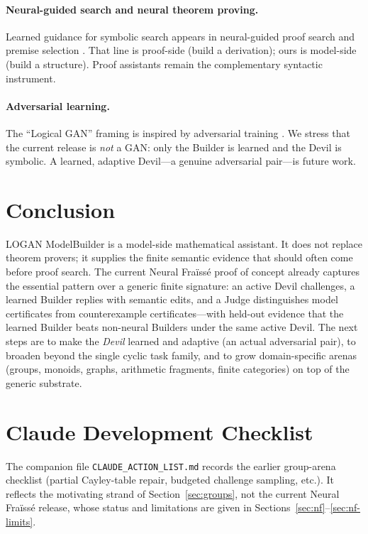 \documentclass[11pt]{article}
\newcommand{\LOGAN}{\textsc{LOGAN}}
\begin{document}
\paragraph{Neural-guided search and neural theorem proving.}
Learned guidance for symbolic search appears in neural-guided proof search and premise selection \cite{Polu2020}.  That line is proof-side (build a derivation); ours is model-side (build a structure).  Proof assistants remain the complementary syntactic instrument.

\paragraph{Adversarial learning.}
The ``Logical GAN'' framing is inspired by adversarial training \cite{Goodfellow2014}.  We stress that the current release is \emph{not} a GAN: only the Builder is learned and the Devil is symbolic.  A learned, adaptive Devil---a genuine adversarial pair---is future work.

\section{Conclusion}

\LOGAN{} ModelBuilder is a model-side mathematical assistant.  It does not replace theorem provers; it supplies the finite semantic evidence that should often come before proof search.  The current Neural Fra\"iss\'e proof of concept already captures the essential pattern over a generic finite signature: an active Devil challenges, a learned Builder replies with semantic edits, and a Judge distinguishes model certificates from counterexample certificates---with held-out evidence that the learned Builder beats non-neural Builders under the same active Devil.  The next steps are to make the \emph{Devil} learned and adaptive (an actual adversarial pair), to broaden beyond the single cyclic task family, and to grow domain-specific arenas (groups, monoids, graphs, arithmetic fragments, finite categories) on top of the generic substrate.

\appendix

\section{Claude Development Checklist}

The companion file \texttt{CLAUDE\_ACTION\_LIST.md} records the earlier group-arena checklist (partial Cayley-table repair, budgeted challenge sampling, etc.).  It reflects the motivating strand of Section~\ref{sec:groups}, not the current Neural Fra\"iss\'e release, whose status and limitations are given in Sections~\ref{sec:nf}--\ref{sec:nf-limits}.
\end{document}
